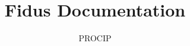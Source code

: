 \documentclass[11pt]{book}
\title{Fidus Documentation}
\author{PROCIP}
\begin{document}
\maketitle
\def\title#1{\chapter{#1}}
\tableofcontents

        
        
        
        
\end{document}
